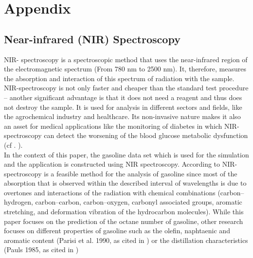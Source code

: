 \documentclass[11pt,twoside,a4paper]{article}
\begin{document}
	\nocite{James.2009} %
	
	\newpage
	\section{Appendix}
	
	\subsection{Near-infrared (NIR) Spectroscopy}\label{NIR}
	NIR- spectroscopy is a spectroscopic method that uses the near-infrared region of the electromagnetic spectrum (From 780 nm to 2500 nm). It, therefore, measures the absorption and interaction of this spectrum of radiation with the sample. NIR-spectroscopy is not only faster and cheaper than the standard test procedure – another significant advantage is that it does not need a reagent and thus does not destroy the sample. It is used for analysis in different sectors and fields, like the agrochemical industry and healthcare. Its non-invasive nature makes it also an asset for medical applications like the monitoring of diabetes in which NIR-spectroscopy can detect the worsening of the blood glucose metabolic dysfunction (cf . \cite{FR_li_et_al_2020}). \\
	In the context of this paper, the gasoline data set which is used for the simulation and the application is constructed using NIR spectroscopy. According to \cite{Bohacs_Ovadi_Salgo1998} NIR-spectroscopy is a feasible method for the analysis of gasoline since most of the absorption that is observed within the described interval of wavelengths is due to overtones and interactions of the radiation with chemical combinations (carbon–hydrogen, carbon–carbon, carbon–oxygen, carbonyl associated groups, aromatic stretching, and deformation vibration of the hydrocarbon molecules). While this paper focuses on the prediction of the octane number of gasoline, other research focuses  on different properties of gasoline such as the olefin, naphtaenic and aromatic content (Parisi et al. 1990, as cited in \cite{Bohacs_Ovadi_Salgo1998}) or the distillation characteristics (Pauls 1985, as cited in \cite{Bohacs_Ovadi_Salgo1998})
	\vspace{0.5cm}
\end{document}
